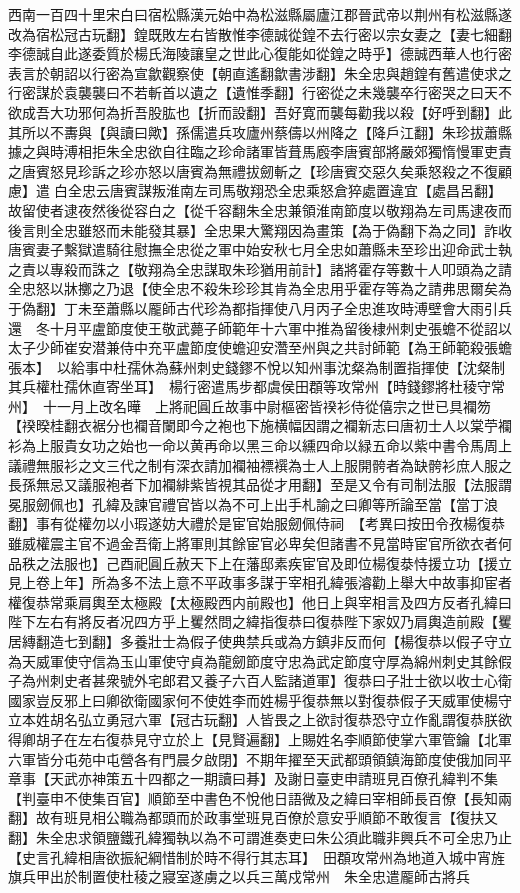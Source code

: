 西南一百四十里宋白曰宿松縣漢元始中為松滋縣屬廬江郡晉武帝以荆州有松滋縣遂改為宿松冠古玩翻】鍠既敗左右皆散惟李德誠從鍠不去行密以宗女妻之【妻七細翻李德誠自此遂委質於楊氏海陵讓皇之世此心復能如從鍠之時乎】德誠西華人也行密表言於朝詔以行密為宣歙觀察使【朝直遙翻歙書涉翻】朱全忠與趙鍠有舊遣使求之行密謀於袁襲襲曰不若斬首以遺之【遺惟季翻】行密從之未幾襲卒行密哭之曰天不欲成吾大功邪何為折吾股肱也【折而設翻】吾好寛而襲每勸我以殺【好呼到翻】此其所以不夀與【與讀曰歟】孫儒遣兵攻廬州蔡儔以州降之【降戶江翻】朱珍拔蕭縣據之與時溥相拒朱全忠欲自往臨之珍命諸軍皆葺馬廏李唐賓部將嚴郊獨惰慢軍吏責之唐賓怒見珍訴之珍亦怒以唐賓為無禮拔劒斬之【珍唐賓交惡久矣乘怒殺之不復顧慮】遣白全忠云唐賓謀叛淮南左司馬敬翔恐全忠乘怒倉猝處置違宜【處昌呂翻】故留使者逮夜然後從容白之【從千容翻朱全忠兼領淮南節度以敬翔為左司馬逮夜而後言則全忠雖怒而未能發其暴】全忠果大驚翔因為畫策【為于偽翻下為之同】詐收唐賓妻子繫獄遣騎往慰撫全忠從之軍中始安秋七月全忠如蕭縣未至珍出迎命武士執之責以專殺而誅之【敬翔為全忠謀取朱珍猶用前計】諸將霍存等數十人叩頭為之請全忠怒以牀擲之乃退【使全忠不殺朱珍珍其肯為全忠用乎霍存等為之請弗思爾矣為于偽翻】丁未至蕭縣以龎師古代珍為都指揮使八月丙子全忠進攻時溥壁會大雨引兵還　冬十月平盧節度使王敬武薨子師範年十六軍中推為留後棣州刺史張蟾不從詔以太子少師崔安潜兼侍中充平盧節度使蟾迎安濳至州與之共討師範【為王師範殺張蟾張本】　以給事中杜孺休為蘇州刺史錢鏐不悅以知州事沈粲為制置指揮使【沈粲制其兵權杜孺休直寄坐耳】　楊行密遣馬步都虞侯田頵等攻常州【時錢鏐將杜稜守常州】　十一月上改名曄　上將祀圓丘故事中尉樞密皆䙆衫侍從僖宗之世已具襴笏【䙆暌桂翻衣裾分也襴音闌即今之袍也下施横幅因謂之襴新志曰唐初士人以棠苧襴衫為上服貴女功之始也一命以黄再命以黑三命以纁四命以緑五命以紫中書令馬周上議禮無服衫之文三代之制有深衣請加襴袖褾襈為士人上服開骻者為缺骻衫庶人服之長孫無忌又議服袍者下加襴緋紫皆視其品從才用翻】至是又令有司制法服【法服謂冕服劒佩也】孔緯及諫官禮官皆以為不可上出手札諭之曰卿等所論至當【當丁浪翻】事有從權勿以小瑕遂妨大禮於是宦官始服劒佩侍祠　【考異曰按田令孜楊復恭雖威權震主官不過金吾衛上將軍則其餘宦官必卑矣但諸書不見當時宦官所欲衣者何品秩之法服也】己酉祀圓丘赦天下上在藩邸素疾宦官及即位楊復㳟恃援立功【援立見上卷上年】所為多不法上意不平政事多謀于宰相孔緯張濬勸上舉大中故事抑宦者權復恭常乘肩輿至太極殿【太極殿西内前殿也】他日上與宰相言及四方反者孔緯曰陛下左右有將反者况四方乎上矍然問之緯指復恭曰復恭陛下家奴乃肩輿造前殿【矍居縳翻造七到翻】多養壯士為假子使典禁兵或為方鎮非反而何【楊復恭以假子守立為天威軍使守信為玉山軍使守貞為龍劒節度守忠為武定節度守厚為綿州刺史其餘假子為州刺史者甚衆號外宅郎君又養子六百人監諸道軍】復恭曰子壯士欲以收士心衛國家豈反邪上曰卿欲衛國家何不使姓李而姓楊乎復恭無以對復恭假子天威軍使楊守立本姓胡名弘立勇冠六軍【冠古玩翻】人皆畏之上欲討復恭恐守立作亂謂復恭朕欲得卿胡子在左右復恭見守立於上【見賢遍翻】上賜姓名李順節使掌六軍管鑰【北軍六軍皆分屯苑中屯營各有門晨夕啟閉】不期年擢至天武都頭領鎮海節度使俄加同平章事【天武亦神策五十四都之一期讀曰朞】及謝日臺吏申請班見百僚孔緯判不集【判臺申不使集百官】順節至中書色不悅他日語微及之緯曰宰相師長百僚【長知兩翻】故有班見相公職為都頭而於政事堂班見百僚於意安乎順節不敢復言【復扶又翻】朱全忠求領鹽鐵孔緯獨執以為不可謂進奏吏曰朱公須此職非興兵不可全忠乃止【史言孔緯相唐欲振紀綱惜制於時不得行其志耳】　田頵攻常州為地道入城中宵旌旗兵甲出於制置使杜稜之寢室遂虜之以兵三萬戍常州　朱全忠遣龎師古將兵